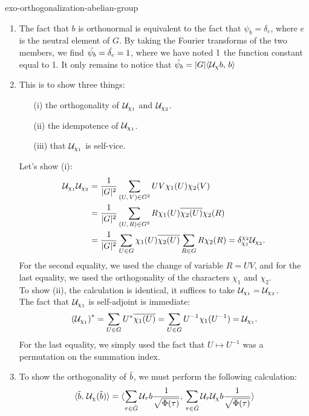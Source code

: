  
\begin{correction}{exo-orthogonalization-abelian-group}
\begin{enumerate}
\item The fact that $ b $ is orthonormal is equivalent to the fact that $ \psi_b = \delta_{e} $, where $ e $ is the neutral element of $ G $. By taking the Fourier transforms of the two members, we find $ \hat{\psi_b} = \hat{\delta_{e}} = 1 $, where we have noted $ 1 $ the function constant equal to 1. It only remains to notice that $ \hat{\psi_b} = |G| \langle \mathcal{U}_\chi b,\,b\rangle $
\item This is to show three things: \begin{itemize}
\item [{\upshape (i)}] the orthogonality of $ \mathcal{U}_{\chi_1} $ and $ \mathcal{U}_{\chi_2} $.
\item [{\upshape (ii)}] the idempotence of $ \mathcal{U}_{\chi_1} $.
\item [{\upshape (iii)}] that $ \mathcal{U}_{\chi_1} $ is self-vice.
\end{itemize} Let's show (i):
\begin{align*}
\mathcal{U}_{\chi_1} \mathcal{U}_{\chi_2} & = \frac{1}{|G|^2} \sum_{(U, \, V) \in G^2}{UV \chi_1 (U) \chi_2 (V)} \\
& = \frac{1}{|G|^2} \sum_{(U, \, R) \in G^2}{R \chi_1 (U) \overline{\chi_2 (U)} \chi_2 (R )} \\
& = \frac{1}{|G|^2} \sum_{U \in G}{\chi_1 (U) \overline{\chi_2 (U)}} \sum_{R \in G}{R \chi_2 (R)} = \delta_{\chi_1}^{\chi_2} \mathcal{U}_{\chi_2}.
\end{align*}
For the second equality, we used the change of variable $ R = UV $, and for the last equality, we used the orthogonality of the characters $ \chi_1 $ and $ \chi_2 $. \\To show (ii), the calculation is identical, it suffices to take $ \mathcal{U}_{\chi_1} = \mathcal{U}_{\chi_2} $. \\The fact that $ \mathcal{U}_{\chi_1} $ is self-adjoint is immediate:
\begin{equation*}
\left(\mathcal{U}_{\chi_1} \right)^* = \sum_{U \in G}{U^* \overline{\chi_1 (U)}} = \sum_{U \in G}{U^{-1} \chi_1 (U^{-1})} = \mathcal{U}_{\chi_1}.
\end{equation*}
For the last equality, we simply used the fact that $ U \mapsto U^{-1} $ was a permutation on the summation index.
\item To show the orthogonality of $ \tilde{b} $, we must perform the following calculation:
\begin{align*}
\dotp{\wt{b}}{\Uu_\chi (\wt{b})} & = \dotp{\sum_{\tau \in \wh{G}}{\Uu_\tau b \frac{1}{\sqrt{\Phi (\tau)}}}}{\sum_{\tau \in \wh{G}}{\Uu_\tau \Uu_\chi b \frac{1}{\sqrt{\Phi (\tau)}}}} \\

\end{align*}
\end{enumerate}
\end{correction}
